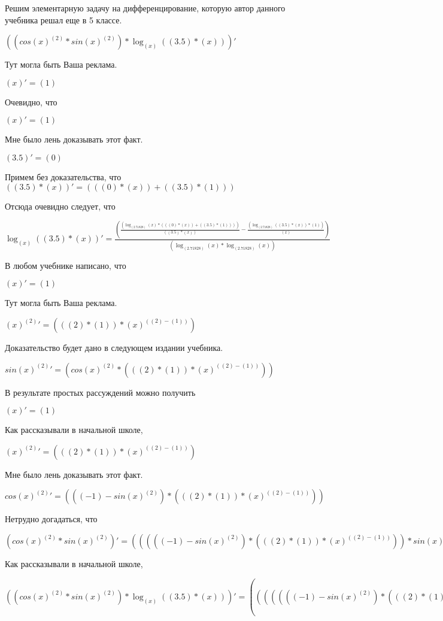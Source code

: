 \documentclass[12pt,a4paper,fleqn]{article}
\theoremstyle{definition}
\begin{document}
Решим элементарную задачу на дифференцирование, которую автор данного учебника решал еще в 5 классе.


$((cos{( x )}^{( 2 )} * sin{( x )}^{( 2 )}) * \log_{( x )}{(( 3.5 ) * ( x ))})'$

Тут могла быть Ваша реклама.

$( x )' = ( 1 )$

Очевидно, что

$( x )' = ( 1 )$

Мне было лень доказывать этот факт.

$( 3.5 )' = ( 0 )$

Примем без доказательства, что
$(( 3.5 ) * ( x ))' = ((( 0 ) * ( x )) + (( 3.5 ) * ( 1 )))$

Отсюда очевидно следует, что

$\log_{( x )}{(( 3.5 ) * ( x ))}' = \frac{(\frac{(\log_{( 2.71828 )}{( x )} * ((( 0 ) * ( x )) + (( 3.5 ) * ( 1 ))))}{(( 3.5 ) * ( x ))}
 - \frac{(\log_{( 2.71828 )}{(( 3.5 ) * ( x ))} * ( 1 ))}{( x )}
)}{(\log_{( 2.71828 )}{( x )} * \log_{( 2.71828 )}{( x )})}
$

В любом учебнике написано, что

$( x )' = ( 1 )$

Тут могла быть Ваша реклама.

${( x )}^{( 2 )}' = ((( 2 ) * ( 1 )) * {( x )}^{(( 2 ) - ( 1 ))})$

Доказательство будет дано в следующем издании учебника.

$sin{( x )}^{( 2 )}' = (cos{( x )}^{( 2 )} * ((( 2 ) * ( 1 )) * {( x )}^{(( 2 ) - ( 1 ))}))$

В результате простых рассуждений можно получить

$( x )' = ( 1 )$

Как рассказывали в начальной школе,

${( x )}^{( 2 )}' = ((( 2 ) * ( 1 )) * {( x )}^{(( 2 ) - ( 1 ))})$

Мне было лень доказывать этот факт.

$cos{( x )}^{( 2 )}' = ((( -1 ) - sin{( x )}^{( 2 )}) * ((( 2 ) * ( 1 )) * {( x )}^{(( 2 ) - ( 1 ))}))$

Нетрудно догадаться, что

$(cos{( x )}^{( 2 )} * sin{( x )}^{( 2 )})' = ((((( -1 ) - sin{( x )}^{( 2 )}) * ((( 2 ) * ( 1 )) * {( x )}^{(( 2 ) - ( 1 ))})) * sin{( x )}^{( 2 )}) + (cos{( x )}^{( 2 )} * (cos{( x )}^{( 2 )} * ((( 2 ) * ( 1 )) * {( x )}^{(( 2 ) - ( 1 ))}))))$

Как рассказывали в начальной школе,

$((cos{( x )}^{( 2 )} * sin{( x )}^{( 2 )}) * \log_{( x )}{(( 3.5 ) * ( x ))})' = ((((((( -1 ) - sin{( x )}^{( 2 )}) * ((( 2 ) * ( 1 )) * {( x )}^{(( 2 ) - ( 1 ))})) * sin{( x )}^{( 2 )}) + (cos{( x )}^{( 2 )} * (cos{( x )}^{( 2 )} * ((( 2 ) * ( 1 )) * {( x )}^{(( 2 ) - ( 1 ))})))) * \log_{( x )}{(( 3.5 ) * ( x ))}) + ((cos{( x )}^{( 2 )} * sin{( x )}^{( 2 )}) * \frac{(\frac{(\log_{( 2.71828 )}{( x )} * ((( 0 ) * ( x )) + (( 3.5 ) * ( 1 ))))}{(( 3.5 ) * ( x ))}
 - \frac{(\log_{( 2.71828 )}{(( 3.5 ) * ( x ))} * ( 1 ))}{( x )}
)}{(\log_{( 2.71828 )}{( x )} * \log_{( 2.71828 )}{( x )})}
))$
\end{document}
